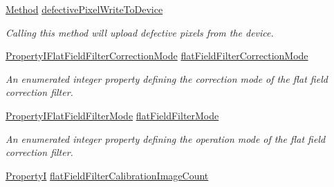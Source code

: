 \begin{DoxyCompactItemize}
\hyperlink{classmv_i_m_p_a_c_t_1_1acquire_1_1_method}{Method} \hyperlink{classmv_i_m_p_a_c_t_1_1acquire_1_1_image_processing_a7fc7e71de3b649a80d02ae944471eb1b}{defective\+Pixel\+Write\+To\+Device}
\begin{DoxyCompactList}\small\item\em Calling this method will upload defective pixels from the device. \end{DoxyCompactList}\item 
\hyperlink{group___common_interface_gae5e0a9f8a06ccd71118818818a717a8c}{Property\+I\+Flat\+Field\+Filter\+Correction\+Mode} \hyperlink{classmv_i_m_p_a_c_t_1_1acquire_1_1_image_processing_ae6922326134aec43993be0e07d4c5f76}{flat\+Field\+Filter\+Correction\+Mode}
\begin{DoxyCompactList}\small\item\em An enumerated integer property defining the correction mode of the flat field correction filter. \end{DoxyCompactList}\item 
\hyperlink{group___common_interface_ga135f01ac2dcf8ddcf43ae998eccb394e}{Property\+I\+Flat\+Field\+Filter\+Mode} \hyperlink{classmv_i_m_p_a_c_t_1_1acquire_1_1_image_processing_a228a7aa520bafcdadc2e30718b6052cf}{flat\+Field\+Filter\+Mode}
\begin{DoxyCompactList}\small\item\em An enumerated integer property defining the operation mode of the flat field correction filter. \end{DoxyCompactList}\item 
\hypertarget{classmv_i_m_p_a_c_t_1_1acquire_1_1_image_processing_ac3eefa02a678739fea5280519ab398f8}{\hyperlink{group___common_interface_ga12d5e434238ca242a1ba4c6c3ea45780}{Property\+I} \hyperlink{classmv_i_m_p_a_c_t_1_1acquire_1_1_image_processing_ac3eefa02a678739fea5280519ab398f8}{flat\+Field\+Filter\+Calibration\+Image\+Count}}\label{classmv_i_m_p_a_c_t_1_1acquire_1_1_image_processing_ac3eefa02a678739fea5280519ab398f8}


\end{DoxyCompactItemize}
